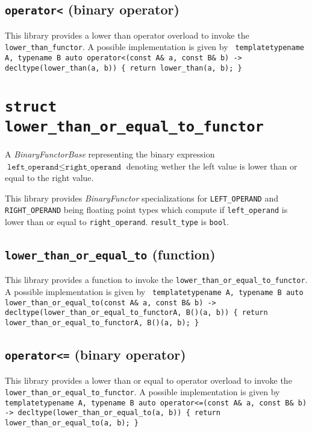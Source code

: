 \documentclass[oneside]{book}
\begin{document}
\subsection{\texttt{operator<} (binary operator)}
This library provides a lower than operator overload to invoke the \texttt{lower\_than\_functor}.
A possible implementation is given by\newline
\texttt{
template\textlangle typename A, typename B\textrangle\newline
auto operator<(const A\& a, const B\& b)\newline
-> decltype(lower\_than(a, b))\newline
\{ return lower\_than(a, b); \}
}

\section{\texttt{struct lower\_than\_or\_equal\_to\_functor}}
A \textit{BinaryFunctorBase} representing the binary expression
$\texttt{left\_operand} \leq \texttt{right\_operand}$
denoting wether the left value is lower than or equal to the right value.\newline

\noindent{}This library provides \textit{BinaryFunctor}         specializations for
\texttt{LEFT\_OPERAND} and   \texttt{RIGHT\_OPERAND} being     floating point types
which compute if \texttt{left\_operand}                   is lower than or equal to
\texttt{right\_operand}. \texttt{result\_type} is \texttt{bool}.

\subsection{\texttt{lower\_than\_or\_equal\_to} (function)}
This library provides a function to invoke the \texttt{lower\_than\_or\_equal\_to\_functor}.
A possible implementation is given by\newline
\texttt{
template\textlangle typename A, typename B\textrangle\newline
auto lower\_than\_or\_equal\_to(const A\& a, const B\& b)\newline
-> decltype(lower\_than\_or\_equal\_to\_functor\textlangle A, B\textrangle()(a, b))\newline
\{ return lower\_than\_or\_equal\_to\_functor\textlangle A, B\textrangle()(a, b); \}
}

\subsection{\texttt{operator<=} (binary operator)}
This library provides a lower than or equal to operator overload to invoke the \texttt{lower\_than\_or\_equal\_to\_functor}.
A possible implementation is given by\newline
\texttt{
template\textlangle typename A, typename B\textrangle\newline
auto operator<=(const A\& a, const B\& b)\newline
-> decltype(lower\_than\_or\_equal\_to(a, b))\newline
\{ return lower\_than\_or\_equal\_to(a, b); \}
}
\end{document}
